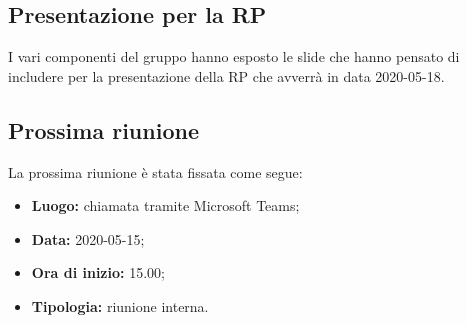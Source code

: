 	\subsection{Presentazione per la RP}
	I vari componenti del gruppo hanno esposto le slide che hanno pensato di includere per la presentazione della RP che avverrà in data 2020-05-18.
		
		
	\subsection{Prossima riunione}
		La prossima riunione è stata fissata come segue:
		\begin{itemize}
			\item \textbf{Luogo: } chiamata tramite Microsoft Teams; 
			\item \textbf{Data: } 2020-05-15;
			\item \textbf{Ora di inizio: } 15.00;
			\item \textbf{Tipologia: } riunione interna.
		\end{itemize}